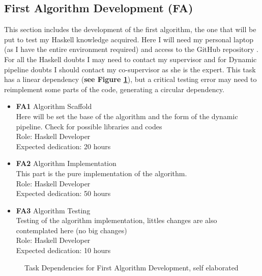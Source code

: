 \subsection{First Algorithm Development \textbf{(FA)}}
This section includes the development of the first algorithm, the one that will be put to test my Haskell knowledge acquired.
Here I will need my personal laptop (as I have the entire environment required) and access to the GitHub repository \cite{GitHubTFG}.
For all the Haskell doubts I may need to contact my supervisor and for Dynamic pipeline doubts I should contact my co-supervisor as she is the expert.
This task has a linear dependency (\textbf{see Figure \ref{FA_dependences}}), but a critical testing error may need to reimplement some parts of the code, generating a circular dependency.
\begin{itemize}
    \item \textbf{FA1} Algorithm Scaffold \\
        Here will be set the base of the algorithm and the form of the dynamic pipeline.
        Check for possible libraries and codes \\
        Role: Haskell Developer\\
        Expected dedication: 20 hours
    \item \textbf{FA2} Algorithm Implementation\\
        This part is the pure implementation of the algorithm. \\
        Role: Haskell Developer \\
        Expected dedication: 50 hours
    \item \textbf{FA3} Algorithm Testing \\
        Testing of the algorithm implementation, littles changes are also contemplated here (no big changes) \\
        Role: Haskell Developer \\
        Expected dedication: 10 hours 
\end{itemize}
\begin{figure}[h]
    \centering
    \caption{Task Dependencies for First Algorithm Development, self elaborated}
    \label{FA_dependences}
\end{figure}

